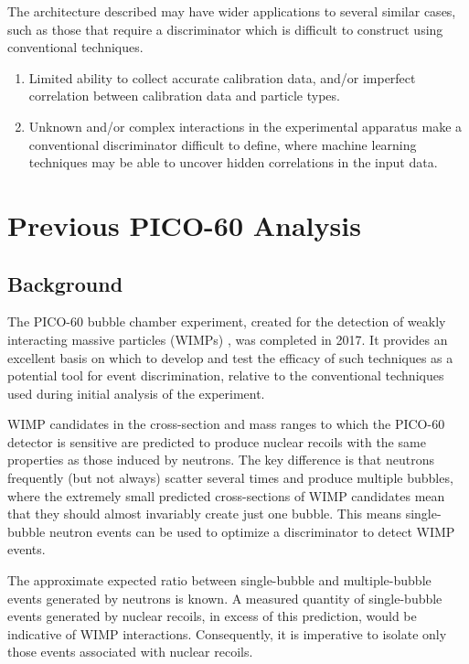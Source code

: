 \documentclass[10pt]{article}
\begin{document}
The architecture described may have wider applications to several similar cases, such as those that require a discriminator which is difficult to construct using conventional techniques.

\begin{enumerate}
    \item Limited ability to collect accurate calibration data, and/or imperfect correlation between calibration data and particle types.
    \item Unknown and/or complex interactions in the experimental apparatus make a conventional discriminator difficult to define, where machine learning techniques may be able to uncover hidden correlations in the input data.
\end{enumerate}

\section{Previous PICO-60 Analysis}

\subsection{Background}

The PICO-60 bubble chamber experiment, created for the detection of weakly interacting massive particles (WIMPs) \cite{pico}, was completed in 2017. It provides an excellent basis on which to develop and test the efficacy of such techniques as a potential tool for event discrimination, relative to the conventional techniques used during initial analysis of the experiment.

WIMP candidates in the cross-section and mass ranges to which the PICO-60 detector is sensitive are predicted to produce nuclear recoils with the same properties as those induced by neutrons. The key difference is that neutrons frequently (but not always) scatter several times and produce multiple bubbles, where the extremely small predicted cross-sections of WIMP candidates mean that they should almost invariably create just one bubble. This means single-bubble neutron events can be used to optimize a discriminator to detect WIMP events.

The approximate expected ratio between single-bubble and multiple-bubble events generated by neutrons is known. A measured quantity of single-bubble events generated by nuclear recoils, in excess of this prediction, would be indicative of WIMP interactions. Consequently, it is imperative to isolate only those events associated with nuclear recoils.
\end{document}
